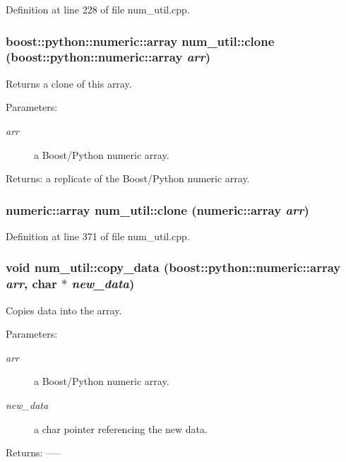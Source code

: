 Definition at line 228 of file num\_\-util.cpp.
\subsubsection{\setlength{\rightskip}{0pt plus 5cm}boost::python::numeric::array num\_\-util::clone (boost::python::numeric::array {\em arr})}\label{namespacenum__util_a72}


Returns a clone of this array. \begin{Desc}
\item[Parameters:]
\begin{description}
\item[{\em arr}]a Boost/Python numeric array. \end{description}
\end{Desc}
\begin{Desc}
\item[Returns:]a replicate of the Boost/Python numeric array.\end{Desc}
\subsubsection{\setlength{\rightskip}{0pt plus 5cm}numeric::array num\_\-util::clone (numeric::array {\em arr})}\label{namespacenum__util_a50}




Definition at line 371 of file num\_\-util.cpp.
\subsubsection{\setlength{\rightskip}{0pt plus 5cm}void num\_\-util::copy\_\-data (boost::python::numeric::array {\em arr}, char $\ast$ {\em new\_\-data})}\label{namespacenum__util_a49}


Copies data into the array. \begin{Desc}
\item[Parameters:]
\begin{description}
\item[{\em arr}]a Boost/Python numeric array. \item[{\em new\_\-data}]a char pointer referencing the new data. \end{description}
\end{Desc}
\begin{Desc}
\item[Returns:]-----\end{Desc}


